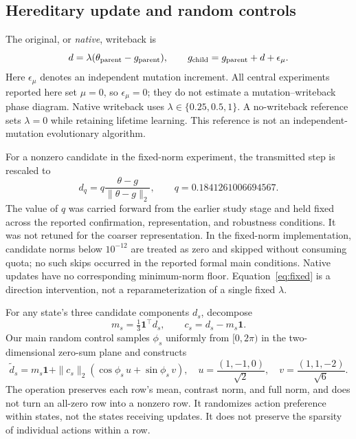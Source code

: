 \documentclass[11pt]{article}
\begin{document}
\subsection{Hereditary update and random controls}
The original, or \emph{native}, writeback is
\begin{equation}\label{eq:native}
d=\lambda(\theta_{\rm parent}-g_{\rm parent}),\qquad
g_{\rm child}=g_{\rm parent}+d+\epsilon_{\mu}.
\end{equation}
Here $\epsilon_{\mu}$ denotes an independent mutation increment. All central experiments reported here set $\mu=0$, so $\epsilon_{\mu}=0$; they do not estimate a mutation--writeback phase diagram. Native writeback uses $\lambda\in\{0.25,0.5,1\}$. A no-writeback reference sets $\lambda=0$ while retaining lifetime learning. This reference is not an independent-mutation evolutionary algorithm.

For a nonzero candidate in the fixed-norm experiment, the transmitted step is rescaled to
\begin{equation}\label{eq:fixed}
d_q=q\frac{\theta-g}{\|\theta-g\|_2},\qquad q=0.1841261006694567.
\end{equation}
The value of $q$ was carried forward from the earlier study stage and held fixed across the reported confirmation, representation, and robustness conditions. It was not retuned for the coarser representation. In the fixed-norm implementation, candidate norms below $10^{-12}$ are treated as zero and skipped without consuming quota; no such skips occurred in the reported formal main conditions. Native updates have no corresponding minimum-norm floor. Equation~\ref{eq:fixed} is a direction intervention, not a reparameterization of a single fixed $\lambda$.

For any state's three candidate components $d_s$, decompose
\begin{equation}
m_s=\tfrac13\mathbf1^\top d_s,\qquad c_s=d_s-m_s\mathbf1.
\end{equation}
Our main random control samples $\phi_s$ uniformly from $[0,2\pi)$ in the two-dimensional zero-sum plane and constructs
\begin{equation}\label{eq:rotation}
\widetilde d_s=m_s\mathbf1+\|c_s\|_2(\cos\phi_s\,u+\sin\phi_s\,v),\quad
u=\frac{(1,-1,0)}{\sqrt2},\quad v=\frac{(1,1,-2)}{\sqrt6}.
\end{equation}
The operation preserves each row's mean, contrast norm, and full norm, and does not turn an all-zero row into a nonzero row. It randomizes action preference within states, not the states receiving updates. It does not preserve the sparsity of individual actions within a row.
\end{document}
